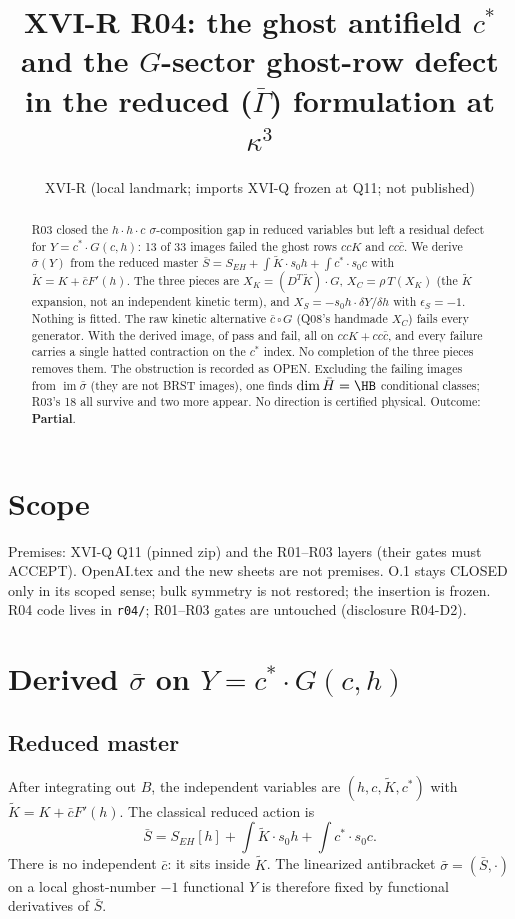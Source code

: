 \documentclass[11pt]{article}
\title{XVI-R R04: the ghost antifield $c^*$ and the $G$-sector ghost-row defect\\
in the reduced ($\bar\Gamma$) formulation at $\kappa^3$}
\author{XVI-R (local landmark; imports XVI-Q frozen at Q11; not published)}
\date{}
\begin{document}
\maketitle
\begin{abstract}
R03 closed the $h\cdot h\cdot c$ $\sigma$-composition gap in reduced variables but left a residual defect for
$Y=c^*\cdot G(c,h)$: 13 of 33 images failed the ghost rows $ccK$ and $cc\bar c$. We derive $\bar\sigma(Y)$ from the
reduced master $\bar S=S_{EH}+\int\tilde K\cdot s_0h+\int c^*\cdot s_0c$ with $\tilde K=K+\bar c F'(h)$. The three
pieces are $X_K=(D^T\tilde K)\cdot G$, $X_C=\rho\,T(X_K)$ (the $\tilde K$ expansion, not an independent kinetic term),
and $X_S=-s_0h\cdot\delta Y/\delta h$ with $\epsilon_S=-1$. Nothing is fitted. The raw kinetic alternative
$\bar c\,\square\,G$ (Q08's handmade $X_C$) fails every generator. With the derived image, \NP{} of \NGens{} pass and
\NF{} fail, all on $ccK{+}cc\bar c$, and every failure carries a single hatted contraction on the $c^*$ index. No
completion of the three pieces removes them. The obstruction is recorded as OPEN. Excluding the failing images from
$\operatorname{im}\bar\sigma$ (they are not BRST images), one finds $\dim\bar H=\HB$ conditional classes; R03's 18 all
survive and two more appear. No direction is certified physical. Outcome: \textbf{Partial}.
\end{abstract}

\section{Scope}
Premises: XVI-Q Q11 (pinned zip) and the R01--R03 layers (their gates must ACCEPT). OpenAI.tex and the new sheets are
not premises. O.1 stays CLOSED only in its scoped sense; bulk symmetry is not restored; the insertion is frozen.
R04 code lives in \texttt{r04/}; R01--R03 gates are untouched (disclosure R04-D2).

\section{Derived $\bar\sigma$ on $Y=c^*\cdot G(c,h)$}
\subsection{Reduced master}
After integrating out $B$, the independent variables are $(h,c,\tilde K,c^*)$ with $\tilde K=K+\bar c F'(h)$. The
classical reduced action is
\[ \bar S = S_{EH}[h] + \int \tilde K\cdot s_0 h + \int c^*\cdot s_0 c . \]
There is no independent $\bar c$: it sits inside $\tilde K$. The linearized antibracket $\bar\sigma=(\bar S,\cdot)$ on a
local ghost-number $-1$ functional $Y$ is therefore fixed by functional derivatives of $\bar S$.
\end{document}
